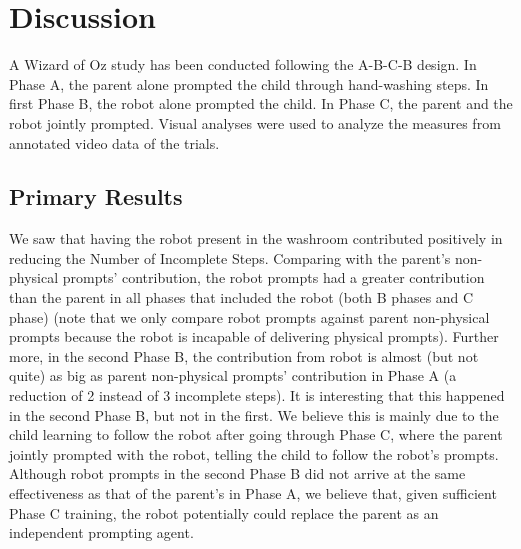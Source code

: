 \section{Discussion}
A Wizard of Oz study has been conducted following the A-B-C-B design.  In Phase A, the parent alone prompted the child through hand-washing steps.  In first Phase B, the robot alone prompted the child.  In Phase C, the parent and the robot jointly prompted.  Visual analyses were used to analyze the measures from annotated video data of the trials.



\subsection{Primary Results}
We saw that having the robot present in the washroom contributed positively in reducing the Number of Incomplete Steps.  Comparing with the parent's non-physical prompts' contribution, the robot prompts had a greater contribution than the parent in all phases that included the robot (both B phases and C phase) (note that we only compare robot prompts against parent non-physical prompts because the robot is incapable of delivering physical prompts).  Further more, in the second Phase B, the contribution from robot is almost (but not quite) as big as parent non-physical prompts' contribution in Phase A (a reduction of 2 instead of 3 incomplete steps).  It is interesting that this happened in the second Phase B, but not in the first.  We believe this is mainly due to the child learning to follow the robot after going through Phase C, where the parent jointly prompted with the robot, telling the child to follow the robot's prompts.  Although robot prompts in the second Phase B did not arrive at the same effectiveness as that of the parent's in Phase A, we believe that, given sufficient Phase C training, the robot potentially could replace the parent as an independent prompting agent.

